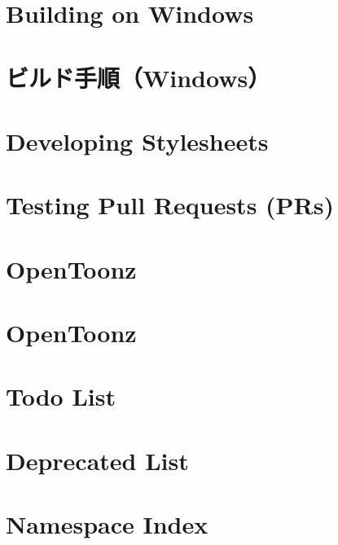 \documentclass[twoside]{book}
\newcommand{\+}{\discretionary{\mbox{\scriptsize$\hookleftarrow$}}{}{}}
\begin{document}
\chapter{Building on Windows}
\label{md__e__opentoonz_doc_how_to_build_win}

\chapter{ビルド手順（\+Windows）}
\label{md__e__opentoonz_doc_how_to_build_win_ja}

\chapter{Developing Stylesheets}
\label{md__e__opentoonz_doc_how_to_stylesheet}

\chapter{Testing Pull Requests (PRs)}
\label{md__e__opentoonz_doc_how_to_test_prs}

\chapter{Open\+Toonz}
\label{md__e__opentoonz_doc__r_e_a_d_m_e_ja}

\chapter{Open\+Toonz}
\label{md__e__opentoonz__r_e_a_d_m_e}

\chapter{Todo List}
\label{todo}

\chapter{Deprecated List}
\label{deprecated}

\chapter{Namespace Index}

\end{document}
